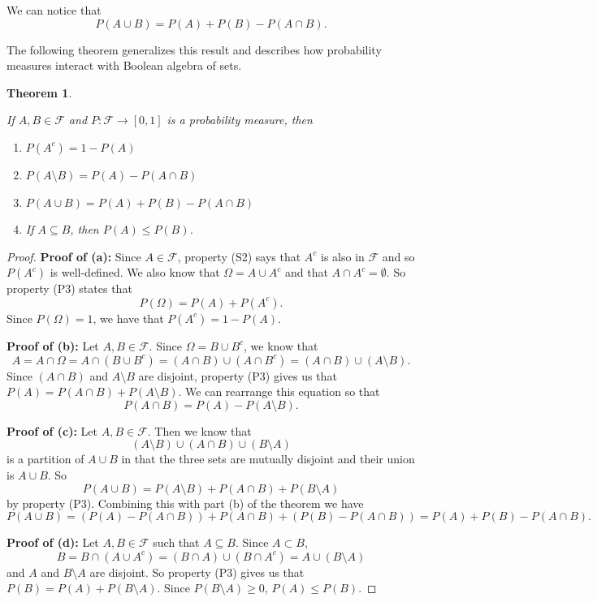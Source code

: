 \documentclass[
]{book}
\providecommand{\tightlist}{%
  \setlength{\itemsep}{0pt}\setlength{\parskip}{0pt}}
\newtheorem{theorem}{Theorem}[chapter]
\theoremstyle{definition}
\theoremstyle{definition}
\theoremstyle{definition}
\theoremstyle{definition}
\theoremstyle{remark}
\begin{document}
We can notice that \[P(A\cup B) = P(A) + P(B) - P(A\cap B).\]

The following theorem generalizes this result and describes how probability measures interact with Boolean algebra of sets.

\begin{theorem}
\protect\hypertarget{thm:unlabeled-div-308}{}\label{thm:unlabeled-div-308}

If \(A, B\in \mathcal{F}\) and \(P:\mathcal{F}\rightarrow [0,1]\) is a probability measure, then

\begin{enumerate}
\def\labelenumi{\alph{enumi}.}
\tightlist
\item
  \(P(A^c) = 1- P(A)\)
\item
  \(P(A \setminus B) = P(A) - P(A\cap B)\)
\item
  \(P(A \cup B) = P(A)+P(B) - P(A\cap B)\)
\item
  If \(A\subseteq B\), then \(P(A)\leq P(B)\).
\end{enumerate}

\end{theorem}

\begin{proof}

\textbf{Proof of (a):} Since \(A\in \mathcal{F}\), property (S2) says that \(A^c\) is also in \(\mathcal{F}\) and so \(P(A^c)\) is well-defined. We also know that \(\Omega = A \cup A^c\) and that \(A\cap A^c = \emptyset\). So property (P3) states that
\[ P(\Omega) = P(A) + P(A^c).\] Since \(P(\Omega)=1\), we have that \(P(A^c)=1-P(A)\).

\textbf{Proof of (b):} Let \(A,B\in \mathcal{F}\). Since \(\Omega = B \cup B^c\), we know that \[A = A \cap \Omega = A \cap (B \cup B^c) = (A\cap B) \cup (A \cap B^c) = (A\cap B) \cup (A \setminus B).\] Since \((A\cap B)\) and \(A\setminus B\) are disjoint, property (P3) gives us that \(P(A) = P(A\cap B) + P(A \setminus B)\). We can rearrange this equation so that \[P(A\cap B) = P(A) - P(A\setminus B).\]

\textbf{Proof of (c):} Let \(A,B\in \mathcal{F}\). Then we know that
\[(A\setminus B) \cup (A\cap B) \cup (B\setminus A)\] is a partition of \(A\cup B\) in that the three sets are mutually disjoint and their union is \(A\cup B\). So
\[P(A\cup B) = P(A\setminus B) + P(A\cap B) + P(B\setminus A)\] by property (P3). Combining this with part (b) of the theorem we have
\[P(A\cup B) = (P(A)-P(A\cap B)) + P(A\cap B) + (P(B)-P(A\cap B)) = P(A) + P(B) - P(A\cap B).\]

\textbf{Proof of (d):} Let \(A,B\in \mathcal{F}\) such that \(A\subseteq B\). Since \(A\subset B\),
\[B= B \cap (A \cup A^c) = (B\cap A) \cup (B\cap A^c) = A \cup (B\setminus A)\] and \(A\) and \(B\setminus A\) are disjoint. So property (P3) gives us that \(P(B) = P(A) + P(B\setminus A)\). Since \(P(B\setminus A) \geq 0\), \(P(A) \leq P(B)\).

\end{proof}
\end{document}
